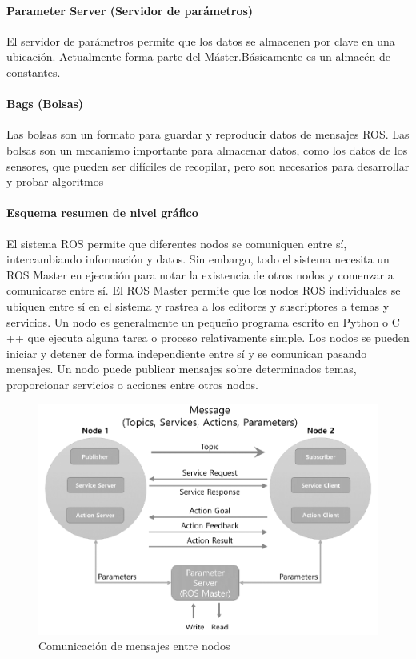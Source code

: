             \paragraph{ Parameter Server (Servidor de parámetros)}
                 El servidor de parámetros permite que los datos se almacenen por clave en una ubicación. Actualmente forma parte del Máster.Básicamente es un almacén de constantes.

               
            \paragraph{Bags (Bolsas)}
            Las bolsas son un formato para guardar y reproducir datos de mensajes ROS. Las bolsas son un mecanismo importante para almacenar datos, como los datos de los sensores, que pueden ser difíciles de recopilar, pero son necesarios para desarrollar y probar algoritmos
               \newpage
               
            \paragraph{Esquema resumen de nivel gráfico}
                El sistema ROS permite que diferentes nodos se comuniquen entre sí, intercambiando información y datos. Sin embargo, todo el sistema necesita un ROS Master en ejecución para notar la existencia de otros nodos y comenzar a comunicarse entre sí. El ROS Master permite que los nodos ROS individuales se ubiquen entre sí en el sistema y rastrea a los editores y suscriptores a temas y servicios. Un nodo es generalmente un pequeño programa escrito en Python o C ++ que ejecuta alguna tarea o proceso relativamente simple. Los nodos se pueden iniciar y detener de forma independiente entre sí y se comunican pasando mensajes. Un nodo puede publicar mensajes sobre determinados temas, proporcionar servicios o acciones entre otros nodos. 
                
                
                
            \begin{figure}[htb]
                \centering
                \includegraphics[width=1.0\linewidth]{Main/Chapter3/Images3/n_s_a_14.PNG}
                \caption{Comunicación de mensajes entre nodos \cite{ROS_BOOK_1}}
                \label{f:Cap3_conceptos_14}
            \end{figure}   

